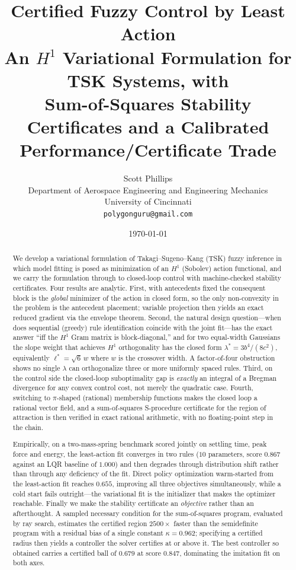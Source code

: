 \documentclass[11pt]{article}
\title{\textbf{Certified Fuzzy Control by Least Action}\\[2mm]
\large An $H^1$ Variational Formulation for TSK Systems, with\\
Sum-of-Squares Stability Certificates and a Calibrated\\
Performance/Certificate Trade}
\author{Scott Phillips\\
\small Department of Aerospace Engineering and Engineering Mechanics\\
\small University of Cincinnati\\
\small \texttt{polygonguru@gmail.com}}
\date{\today}
\theoremstyle{plain}
\theoremstyle{definition}
\begin{document}
\maketitle

\begin{abstract}
We develop a variational formulation of Takagi--Sugeno--Kang (TSK) fuzzy
inference in which model fitting is posed as minimization of an $H^1$
(Sobolev) action functional, and we carry the formulation through to
closed-loop control with machine-checked stability certificates. Four results
are analytic. First, with antecedents fixed the consequent block is the
\emph{global} minimizer of the action in closed form, so the only non-convexity
in the problem is the antecedent placement; variable projection then yields an
exact reduced gradient via the envelope theorem. Second, the natural design
question---when does sequential (greedy) rule identification coincide with the
joint fit---has the exact answer ``iff the $H^1$ Gram matrix is
block-diagonal,'' and for two equal-width Gaussians the slope weight that
achieves $H^1$ orthogonality has the closed form
$\lambda^{*}=3b^{4}/(8c^{2})$, equivalently $\ell^{*}=\sqrt{6}\,w$ where $w$ is
the crossover width. A factor-of-four obstruction shows no single $\lambda$ can
orthogonalize three or more uniformly spaced rules. Third, on the control side
the closed-loop suboptimality gap is \emph{exactly} an integral of a Bregman
divergence for any convex control cost, not merely the quadratic case. Fourth,
switching to $\pi$-shaped (rational) membership functions makes the closed loop
a rational vector field, and a sum-of-squares S-procedure certificate for the
region of attraction is then verified in exact rational arithmetic, with no
floating-point step in the chain.

Empirically, on a two-mass-spring benchmark scored jointly on settling time,
peak force and energy, the least-action fit converges in two rules ($10$
parameters, score $0.867$ against an LQR baseline of $1.000$) and then degrades
through distribution shift rather than through any deficiency of the fit.
Direct policy optimization warm-started from the least-action fit reaches
$0.655$, improving all three objectives simultaneously, while a cold start
fails outright---the variational fit is the initializer that makes the
optimizer reachable. Finally we make the stability certificate an
\emph{objective} rather than an afterthought. A sampled necessary condition for
the sum-of-squares program, evaluated by ray search, estimates the certified
region $2500\times$ faster than the semidefinite program with a residual bias
of a single constant $\kappa=0.962$; specifying a certified radius then yields
a controller the solver certifies at or above it. The best controller so
obtained carries a certified ball of $0.679$ at score $0.847$, dominating the
imitation fit on both axes.
\end{abstract}
\end{document}
